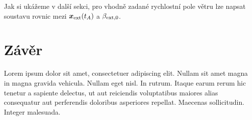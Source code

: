 \documentclass[reqno, a4paper]{amsart}
\numberwithin{equation}{section}
\begin{document}
Jak si ukážeme v další sekci, pro vhodně zadané rychlostní pole větru lze napsat soustavu rovnic mezi $\bm{x}_{\mathrm{ext}}(t_{A})$ a $ \beta_{\mathrm{ext}, 0}$.


\section{Závěr}
\label{sec:Závěr}
Lorem ipsum dolor sit amet, consectetuer adipiscing elit. Nullam sit amet magna in magna gravida vehicula. Nullam eget nisl. In rutrum. Itaque earum rerum hic tenetur a sapiente delectus, ut aut reiciendis voluptatibus maiores alias consequatur aut perferendis doloribus asperiores repellat. Maecenas sollicitudin. Integer malesuada.\citep{prusa.tuma}



































\end{document}
